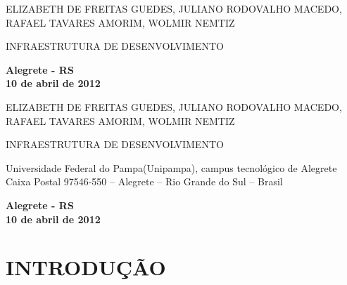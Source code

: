 \documentclass[12pt,a4paper]{article}
\begin{document}
\begin{titlepage}

\begin{center}
{\LARGE ELIZABETH DE FREITAS GUEDES, JULIANO RODOVALHO MACEDO, RAFAEL TAVARES AMORIM, WOLMIR NEMTIZ}
\par
\vspace{200pt}
{\Huge INFRAESTRUTURA DE DESENVOLVIMENTO}
\par
\vfill
\textbf{{\large Alegrete - RS}\\
{\large 10 de abril de 2012}}
\end{center}
\end{titlepage}

\thispagestyle{empty}
\cleardoublepage

\begin{center}
{\LARGE ELIZABETH DE FREITAS GUEDES, JULIANO RODOVALHO MACEDO, RAFAEL TAVARES AMORIM, WOLMIR NEMTIZ}
\par
\vspace{200pt}
{\Huge INFRAESTRUTURA DE DESENVOLVIMENTO}
\end{center}
\par
\vspace{90pt}
\hspace*{175pt}\parbox{7.6cm}{{\large Universidade Federal do Pampa(Unipampa), campus tecnológico de Alegrete
Caixa Postal 97546-550 – Alegrete – Rio Grande do Sul – Brasil
}}

\par
\vspace{1em}
\hspace*{175pt}\parbox{7.6cm}{{\large }}

\par
\vfill
\begin{center}
\textbf{{\large Alegrete - RS}\\
{\large 10 de abril de 2012}}
\end{center}

\thispagestyle{empty}
\clearpage
\thispagestyle{empty}
\tableofcontents
\thispagestyle{empty}
\clearpage

\section{INTRODUÇÃO}
\end{document}

